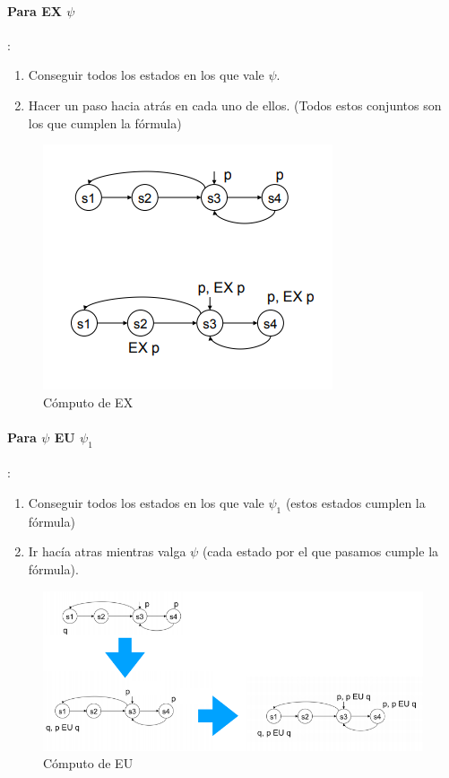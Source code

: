 \paragraph{Para EX $\psi$}: 
\begin{enumerate}
\item Conseguir todos los estados en los que vale $\psi$.
\item Hacer un paso hacia atrás en cada uno de ellos. (Todos estos conjuntos son los que cumplen la fórmula)
\end{enumerate}
\begin{figure}[h]
\centering
	\includegraphics[scale=0.5]{imagenes/computo-ex-explicito}
	\caption{Cómputo de EX}
\end{figure}

\paragraph{Para $\psi$ EU $\psi_1$}: 
\begin{enumerate}
\item Conseguir todos los estados en los que vale $\psi_1$ (estos estados cumplen la fórmula)
\item Ir hacía atras mientras valga $\psi$ (cada estado por el que pasamos cumple la fórmula).
\end{enumerate}
\begin{figure}[h]
\centering
	\includegraphics[scale=0.5]{imagenes/computo-eu-explicito}
	\caption{Cómputo de EU}
\end{figure}
